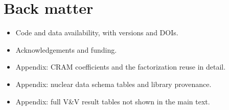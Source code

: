 \section*{Back matter}
\begin{itemize}
  \item Code and data availability, with versions and DOIs.
  \item Acknowledgements and funding.
  \item Appendix: CRAM coefficients and the factorization reuse in detail.
  \item Appendix: nuclear data schema tables and library provenance.
  \item Appendix: full V\&V result tables not shown in the main text.
\end{itemize}
